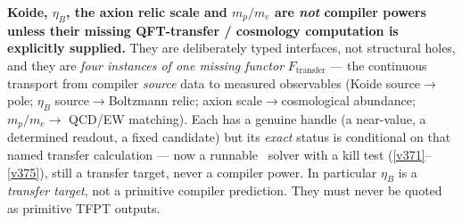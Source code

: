 \begin{gapbox}
\textbf{Koide, $\eta_B$, the axion relic scale and $m_p/m_e$ are \emph{not} compiler powers unless their
missing QFT-transfer / cosmology computation is explicitly supplied.} They are deliberately typed
interfaces, not structural holes, and they are \emph{four instances of one missing functor}
$F_{\mathrm{transfer}}$ --- the continuous transport from compiler \emph{source} data to measured
observables (Koide source$\to$pole; $\eta_B$ source$\to$Boltzmann relic; axion scale$\to$cosmological
abundance; $m_p/m_e\to$ QCD/EW matching). Each has a genuine handle (a near-value, a determined readout,
a fixed candidate) but its \emph{exact} status is conditional on that named transfer calculation --- now a
runnable \mC\ solver with a kill test (\vref{v371}--\vref{v375}), still a transfer target, never a compiler
power. In particular $\eta_B$ is a \emph{transfer target}, not a primitive compiler prediction.
They must never be quoted as primitive TFPT outputs.


\end{gapbox}
